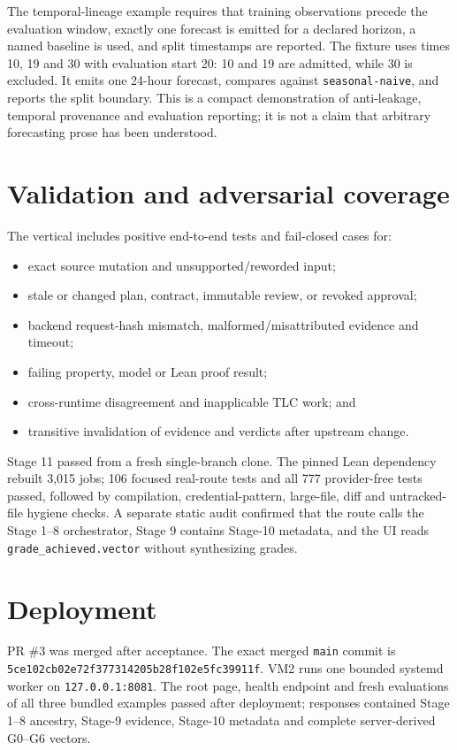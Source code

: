 \documentclass[11pt]{article}
\newcommand{\code}[1]{\texttt{#1}}
\begin{document}
The temporal-lineage example requires that training observations precede the
evaluation window, exactly one forecast is emitted for a declared horizon, a
named baseline is used, and split timestamps are reported.  The fixture uses
times 10, 19 and 30 with evaluation start 20: 10 and 19 are admitted, while 30
is excluded.  It emits one 24-hour forecast, compares against
\code{seasonal-naive}, and reports the split boundary.  This is a compact
demonstration of anti-leakage, temporal provenance and evaluation reporting;
it is not a claim that arbitrary forecasting prose has been understood.

\section{Validation and adversarial coverage}

The vertical includes positive end-to-end tests and fail-closed cases for:

\begin{itemize}
\item exact source mutation and unsupported/reworded input;
\item stale or changed plan, contract, immutable review, or revoked approval;
\item backend request-hash mismatch, malformed/misattributed evidence and timeout;
\item failing property, model or Lean proof result;
\item cross-runtime disagreement and inapplicable TLC work; and
\item transitive invalidation of evidence and verdicts after upstream change.
\end{itemize}

Stage 11 passed from a fresh single-branch clone.  The pinned Lean dependency
rebuilt 3,015 jobs; 106 focused real-route tests and all 777 provider-free tests
passed, followed by compilation, credential-pattern, large-file, diff and
untracked-file hygiene checks.  A separate static audit confirmed that the
route calls the Stage 1--8 orchestrator, Stage 9 contains Stage-10 metadata,
and the UI reads \code{grade\_achieved.vector} without synthesizing grades.

\section{Deployment}

PR \#3 was merged after acceptance.  The exact merged \code{main} commit is
\code{5ce102cb02e72f377314205b28f102e5fc39911f}.  VM2 runs one bounded systemd
worker on \code{127.0.0.1:8081}.  The root page, health endpoint and fresh
evaluations of all three bundled examples passed after deployment; responses
contained Stage 1--8 ancestry, Stage-9 evidence, Stage-10 metadata and complete
server-derived G0--G6 vectors.
\end{document}
